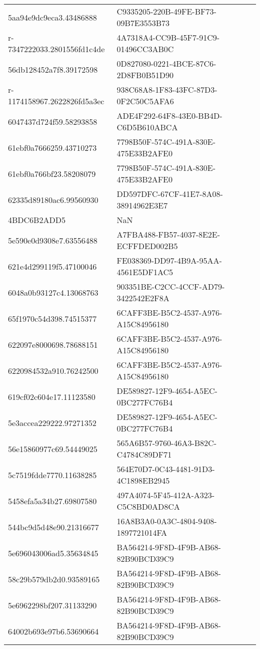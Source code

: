 \begin{tabular}{ll}
5aa94e9dc9eca3.43486888 & C9335205-220B-49FE-BF73-09B7E3553B73 \\
r-7347222033.2801556fd1c4de & 4A7318A4-CC9B-45F7-91C9-01496CC3AB0C \\
56db128452a7f8.39172598 & 0D827080-0221-4BCE-87C6-2D8FB0B51D90 \\
r-1174158967.2622826fd5a3ec & 938C68A8-1F83-43FC-87D3-0F2C50C5AFA6 \\
6047437d724f59.58293858 & ADE4F292-64F8-43E0-BB4D-C6D5B610ABCA \\
61ebf0a7666259.43710273 & 7798B50F-574C-491A-830E-475E33B2AFE0 \\
61ebf0a766bf23.58208079 & 7798B50F-574C-491A-830E-475E33B2AFE0 \\
62335d89180ac6.99560930 & DD597DFC-67CF-41E7-8A08-38914962E3E7 \\
4BDC6B2ADD5 & NaN \\
5e590e0d9308e7.63556488 & A7FBA488-FB57-4037-8E2E-ECFFDED002B5 \\
621e4d299119f5.47100046 & FE038369-DD97-4B9A-95AA-4561E5DF1AC5 \\
6048a0b93127c4.13068763 & 903351BE-C2CC-4CCF-AD79-3422542E2F8A \\
65f1970c54d398.74515377 & 6CAFF3BE-B5C2-4537-A976-A15C84956180 \\
622097e8000698.78688151 & 6CAFF3BE-B5C2-4537-A976-A15C84956180 \\
6220984532a910.76242500 & 6CAFF3BE-B5C2-4537-A976-A15C84956180 \\
619cf02c604e17.11123580 & DE589827-12F9-4654-A5EC-0BC277FC76B4 \\
5e3accea229222.97271352 & DE589827-12F9-4654-A5EC-0BC277FC76B4 \\
56e15860977c69.54449025 & 565A6B57-9760-46A3-B82C-C4784C89DF71 \\
5c7519fdde7770.11638285 & 564E70D7-0C43-4481-91D3-4C1898EB2945 \\
5458efa5a34b27.69807580 & 497A4074-5F45-412A-A323-C5C8BD0AD8CA \\
544bc9d5d48e90.21316677 & 16A8B3A0-0A3C-4804-9408-1897721014FA \\
5e696043006ad5.35634845 & BA564214-9F8D-4F9B-AB68-82B90BCD39C9 \\
58c29b579db2d0.93589165 & BA564214-9F8D-4F9B-AB68-82B90BCD39C9 \\
5e6962298bf207.31133290 & BA564214-9F8D-4F9B-AB68-82B90BCD39C9 \\
64002b693e97b6.53690664 & BA564214-9F8D-4F9B-AB68-82B90BCD39C9 \\

\end{tabular}
